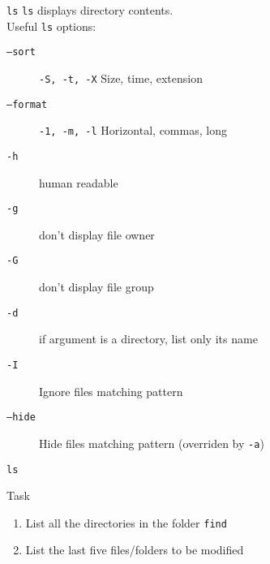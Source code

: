 \documentclass[11pt]{beamer}
\begin{document}
			\begin{frame}{ \texttt{ls}}
				\texttt{ls} displays directory contents. \\
				Useful \texttt{ls} options:
				\begin{description}
					\item[ \texttt{--sort}] \texttt{-S, -t, -X} Size, time, extension
					\item[ \texttt{--format}] \texttt{-1, -m, -l} Horizontal, commas, long
					\item[ \texttt{-h}] human readable
					\item[ \texttt{-g}] don't display file owner
					\item[ \texttt{-G}] don't display file group
					\item[ \texttt{-d}] if argument is a directory, list only its name 
					\item[ \texttt{-I}] Ignore files matching pattern
					\item[ \texttt{--hide}]  Hide files matching pattern (overriden by \texttt{-a})
				\end{description}
			\end{frame}


			\begin{frame}{ \texttt{ls}}
				\begin{block}{Task}
					\begin{enumerate}
						\item List all the directories in the folder \texttt{find}
						\item List the last five files/folders to be modified
					\end{enumerate}
				\end{block}	
				\begin{example}
					\begin{semiverbatim}
						 \end{semiverbatim}	
				\end{example}
			\end{frame}
\end{document}
